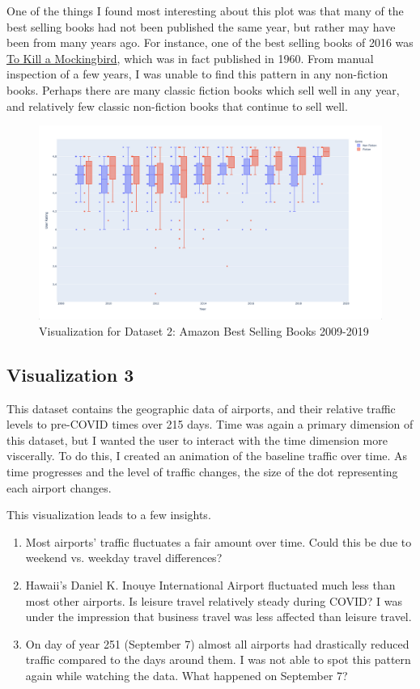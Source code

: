 \documentclass{article}
\begin{document}
One of the things I found most interesting about this plot was that many of the best selling books had not been published the same year, but rather may have been from many years ago. For instance, one of the best selling books of 2016 was \href{https://en.wikipedia.org/wiki/To_Kill_a_Mockingbird}{To Kill a Mockingbird}, which was in fact published in 1960. From manual inspection of a few years, I was unable to find this pattern in any non-fiction books. Perhaps there are many classic fiction books which sell well in any year, and relatively few classic non-fiction books that continue to sell well. 

\begin{figure}[htb]
\caption{Visualization for Dataset 2: Amazon Best Selling Books 2009-2019}
\centering
\includegraphics[width=\textwidth]{Screenshot_Index02.png}
\end{figure}

\subsection{Visualization 3}
This dataset contains the geographic data of airports, and their relative traffic levels to pre-COVID times over 215 days. 
Time was again a primary dimension of this dataset, but I wanted the user to interact with the time dimension more viscerally. To do this, I created an animation of the baseline traffic over time. As time progresses and the level of traffic changes, the size of the dot representing each airport changes. 

This visualization leads to a few insights. 
\begin{enumerate}
    \item Most airports' traffic fluctuates a fair amount over time. Could this be due to weekend vs. weekday travel differences?
    \item Hawaii's Daniel K. Inouye International Airport fluctuated much less than most other airports. Is leisure travel relatively steady during COVID? I was under the impression that business travel was less affected than leisure travel. 
    \item On day of year 251 (September 7) almost all airports had drastically reduced traffic compared to the days around them. I was not able to spot this pattern again while watching the data. What happened on September 7?
\end{enumerate}
\end{document}
